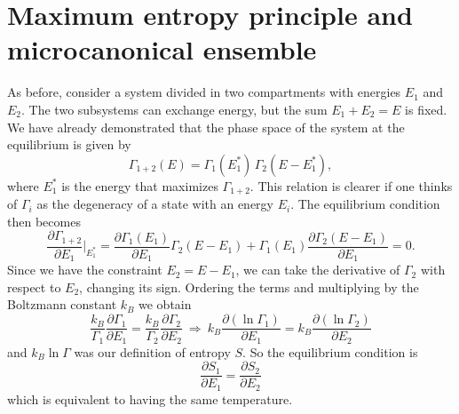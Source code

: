 \section{Maximum entropy principle and microcanonical ensemble}
As before, consider a system divided in two compartments with energies $E_1$ and $E_2$. The two subsystems can exchange energy, but the sum $E_1+E_2 = E$ is fixed. We have already demonstrated that the phase space of the system at the equilibrium is given by 
\begin{equation}
    \Gamma_{1+2}(E) = \Gamma_1(E_1^*)\,\Gamma_2(E-E_1^*),
\end{equation}
where $E_1^*$ is the energy that maximizes $\Gamma_{1+2}$. This relation is clearer if one thinks of $\Gamma_i$ as the degeneracy of a state with an energy $E_i$. The equilibrium condition then becomes
\begin{equation}
    \frac{\partial \Gamma_{1+2}}{\partial E_1}\bigg|_{E_1^*} = \frac{\partial \Gamma_1(E_1)}{\partial E_1} \Gamma_2(E - E_1) + \Gamma_1(E_1)\frac{\partial \Gamma_2(E - E_1)}{\partial E_1} = 0.
\end{equation}
Since we have the constraint $E_2 = E-E_1$, we can take the derivative of $\Gamma_2$ with respect to $E_2$, changing its sign. Ordering the terms and multiplying by the Boltzmann constant $k_B$ we obtain
\begin{equation}
    \frac{k_B}{\Gamma_1} \frac{\partial \Gamma_1}{\partial E_1} = \frac{k_B}{\Gamma_2} \frac{\partial \Gamma_2}{\partial E_2} \: \Longrightarrow \:
    k_B \frac{\partial (\ln{\Gamma_1})}{\partial E_1} = k_B \frac{\partial (\ln{\Gamma_2})}{\partial E_2}
\end{equation}
and $k_B\ln{\Gamma}$ was our definition of entropy $S$. So the equilibrium condition is 
\begin{equation}
    \frac{\partial S_1}{\partial E_1} = \frac{\partial S_2}{\partial E_2}
\end{equation}
which is equivalent to having the same temperature. \\ \\

